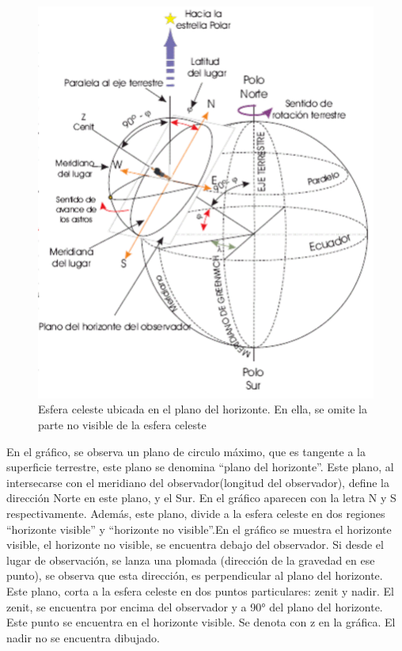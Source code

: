 \begin{figure}[ht!]
	\centering
	\includegraphics[scale=0.5]{esfera_celeste_topo}
	\caption{Esfera celeste ubicada en el plano del horizonte. En ella, se omite la parte no visible de la esfera celeste}
	\label{fig:esfera_celeste_topo}
\end{figure}


En el gráfico, se observa un plano de circulo máximo, que es tangente a la superficie terrestre, este plano se denomina ``plano del horizonte''. Este plano, al intersecarse con el meridiano del observador(longitud del observador), define la dirección Norte en este plano, y el Sur. En el gráfico aparecen con la letra N y S respectivamente. Además, este plano, divide a la esfera celeste en dos regiones ``horizonte visible'' y ``horizonte no visible''.En el gráfico se muestra el horizonte visible, el horizonte no visible, se encuentra debajo del observador. Si desde el lugar de observación, se lanza una plomada (dirección de la gravedad en ese punto), se observa que esta dirección, es perpendicular al plano del horizonte. Este plano, corta a la esfera celeste en dos puntos particulares: zenit y nadir. El zenit, se encuentra por encima del observador y a 90° del plano del horizonte. Este punto se encuentra en el horizonte visible. Se denota con z en la gráfica. El nadir no se encuentra dibujado. 

